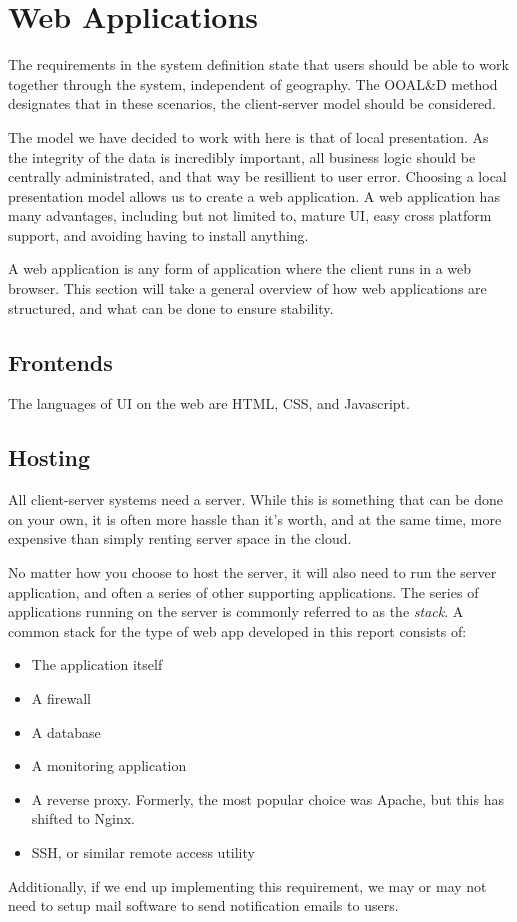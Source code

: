 \section{Web Applications}
The requirements in the system definition state that users should be able to work together through the system, independent of geography.
The OOAL\&D method designates that in these scenarios, the client-server model should be considered.

The model we have decided to work with here is that of local presentation.
As the integrity of the data is incredibly important, all business logic should be centrally administrated, and that way be resillient to user error.
Choosing a local presentation model allows us to create a web application.
A web application has many advantages, including but not limited to, mature UI, easy cross platform support, and avoiding having to install anything.

A web application is any form of application where the client runs in a web browser.
This section will take a general overview of how web applications are structured, and what can be done to ensure stability.


\subsection{Frontends}
The languages of UI on the web are HTML, CSS, and Javascript.
\subsection{Hosting}
All client-server systems need a server.
While this is something that can be done on your own, it is often more hassle than it's worth, and at the same time, more expensive than simply renting server space in the cloud.

No matter how you choose to host the server, it will also need to run the server application, and often a series of other supporting applications.
The series of applications running on the server is commonly referred to as the \textit{stack}.
A common stack for the type of web app developed in this report consists of:
\begin{itemize}
\item The application itself
\item A firewall
\item A database
\item A monitoring application
\item A reverse proxy.
Formerly, the most popular choice was Apache, but this has shifted to Nginx.
\item SSH, or similar remote access utility
\end{itemize}
Additionally, if we end up implementing this requirement, we may or may not need to setup mail software to send notification emails to users.
